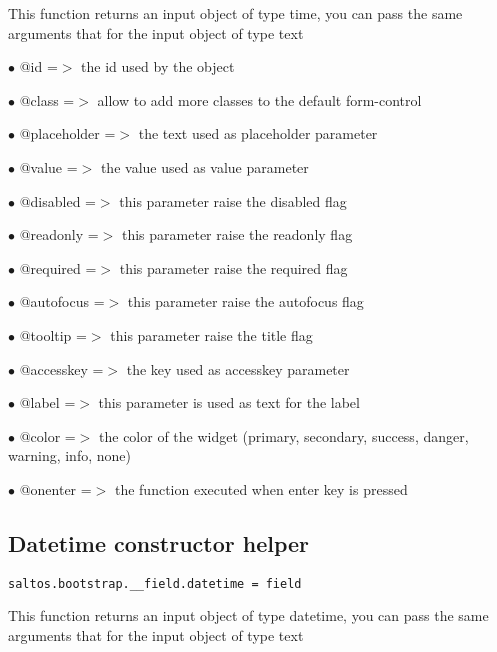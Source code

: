 \documentclass[a4paper]{book}
\begin{document}
This function returns an input object of type time, you can pass the same arguments
that for the input object of type text

\begin{compactitem}
\item[\color{myblue}$\bullet$] @id          =$>$ the id used by the object
\item[\color{myblue}$\bullet$] @class       =$>$ allow to add more classes to the default form-control
\item[\color{myblue}$\bullet$] @placeholder =$>$ the text used as placeholder parameter
\item[\color{myblue}$\bullet$] @value       =$>$ the value used as value parameter
\item[\color{myblue}$\bullet$] @disabled    =$>$ this parameter raise the disabled flag
\item[\color{myblue}$\bullet$] @readonly    =$>$ this parameter raise the readonly flag
\item[\color{myblue}$\bullet$] @required    =$>$ this parameter raise the required flag
\item[\color{myblue}$\bullet$] @autofocus   =$>$ this parameter raise the autofocus flag
\item[\color{myblue}$\bullet$] @tooltip     =$>$ this parameter raise the title flag
\item[\color{myblue}$\bullet$] @accesskey   =$>$ the key used as accesskey parameter
\item[\color{myblue}$\bullet$] @label       =$>$ this parameter is used as text for the label
\item[\color{myblue}$\bullet$] @color       =$>$ the color of the widget (primary, secondary, success, danger, warning, info, none)
\item[\color{myblue}$\bullet$] @onenter     =$>$ the function executed when enter key is pressed
\end{compactitem}

\hypertarget{toc467}{}
\subsection{Datetime constructor helper}

\begin{lstlisting}
saltos.bootstrap.__field.datetime = field
\end{lstlisting}

This function returns an input object of type datetime, you can pass the same arguments
that for the input object of type text
\end{document}
